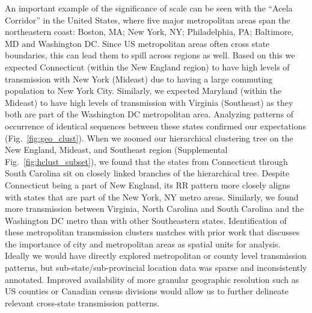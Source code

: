 \documentclass[11pt, letterpaper, oneside]{article}
\begin{document}
An important example of the significance of scale can be seen with the ``Acela Corridor'' in the United States, where five major metropolitan areas span the northeastern coast: Boston, MA; New York, NY; Philadelphia, PA; Baltimore, MD and Washington DC.
Since US metropolitan areas often cross state boundaries, this can lead them to spill across regions as well.
Based on this we expected Connecticut (within the New England region) to have high levels of transmission with New York (Mideast) due to having a large commuting population to New York City.
Similarly, we expected Maryland (within the Mideast) to have high levels of transmission with Virginia (Southeast) as they both are part of the Washington DC metropolitan area.
Analyzing patterns of occurrence of identical sequences between these states confirmed our expectations (Fig.\ \ref{fig:geo_clust}).
When we zoomed our hierarchical clustering tree on the New England, Mideast, and Southeast region (Supplemental Fig.\ \ref{fig:hclust_subset}), we found that the states from Connecticut through South Carolina sit on closely linked branches of the hierarchical tree.
Despite Connecticut being a part of New England, its RR pattern more closely aligns with states that are part of the New York, NY metro areas.
Similarly, we found more transmission between Virginia, North Carolina and South Carolina and the Washington DC metro than with other Southeastern states.
Identification of these metropolitan transmission clusters matches with prior work that discusses the importance of city and metropolitan areas as spatial units for analysis.\autocite{starkLocalVariationsSpatial2012,dalzielUrbanizationHumidityShape2018}
Ideally we would have directly explored metropolitan or county level transmission patterns, but sub-state/sub-provincial location data was sparse and inconsistently annotated.
Improved availability of more granular geographic resolution such as US counties or Canadian census divisions would allow us to further delineate relevant cross-state transmission patterns.
\end{document}
